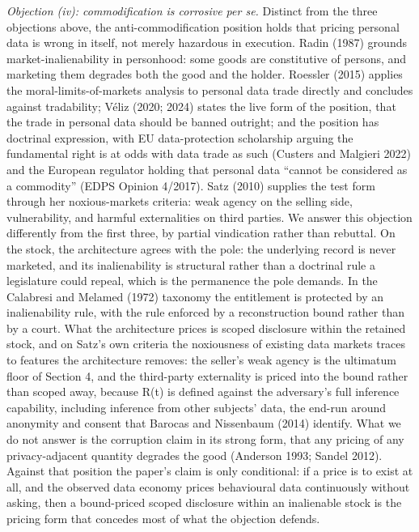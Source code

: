 \documentclass[
  11pt,
]{article}
\begin{document}
\emph{Objection (iv): commodification is corrosive per se.} Distinct
from the three objections above, the anti-commodification position holds
that pricing personal data is wrong in itself, not merely hazardous in
execution. Radin (1987) grounds market-inalienability in personhood:
some goods are constitutive of persons, and marketing them degrades both
the good and the holder. Roessler (2015) applies the
moral-limits-of-markets analysis to personal data trade directly and
concludes against tradability; Véliz (2020; 2024) states the live form
of the position, that the trade in personal data should be banned
outright; and the position has doctrinal expression, with EU
data-protection scholarship arguing the fundamental right is at odds
with data trade as such (Custers and Malgieri 2022) and the European
regulator holding that personal data ``cannot be considered as a
commodity'' (EDPS Opinion 4/2017). Satz (2010) supplies the test form
through her noxious-markets criteria: weak agency on the selling side,
vulnerability, and harmful externalities on third parties. We answer
this objection differently from the first three, by partial vindication
rather than rebuttal. On the stock, the architecture agrees with the
pole: the underlying record is never marketed, and its inalienability is
structural rather than a doctrinal rule a legislature could repeal,
which is the permanence the pole demands. In the Calabresi and Melamed
(1972) taxonomy the entitlement is protected by an inalienability rule,
with the rule enforced by a reconstruction bound rather than by a court.
What the architecture prices is scoped disclosure within the retained
stock, and on Satz's own criteria the noxiousness of existing data
markets traces to features the architecture removes: the seller's weak
agency is the ultimatum floor of Section 4, and the third-party
externality is priced into the bound rather than scoped away, because
R(t) is defined against the adversary's full inference capability,
including inference from other subjects' data, the end-run around
anonymity and consent that Barocas and Nissenbaum (2014) identify. What
we do not answer is the corruption claim in its strong form, that any
pricing of any privacy-adjacent quantity degrades the good (Anderson
1993; Sandel 2012). Against that position the paper's claim is only
conditional: if a price is to exist at all, and the observed data
economy prices behavioural data continuously without asking, then a
bound-priced scoped disclosure within an inalienable stock is the
pricing form that concedes most of what the objection defends.
\end{document}

